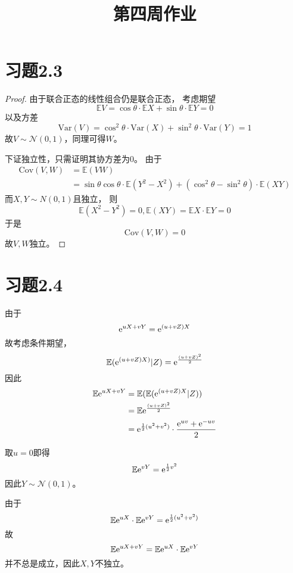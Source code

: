 \documentclass[cn]{homework}
\title{第四周作业}
\newcommand{\E}{\mathbb E}
\newcommand{\var}{\mathrm{Var}}
\newcommand{\cov}{\mathrm{Cov}}
\begin{document}
    \maketitle

    \section{习题2.3}
    \begin{proof}
        由于联合正态的线性组合仍是联合正态，
        考虑期望
        \[\E V=\cos\theta\cdot\E X+\sin\theta\cdot\E Y=0\]
        以及方差
        \[\var(V)=\cos^2\theta\cdot\var(X)+\sin^2\theta\cdot\var(Y)=1\]
        故$V\sim\mathcal N(0,1)$，同理可得$W$。

        下证独立性，只需证明其协方差为0。
        由于
        \[\begin{aligned}
            \cov(V,W)&=\E (VW)\\
            &=\sin\theta\cos\theta\cdot\E(Y^2-X^2)
            +(\cos^2\theta-\sin^2\theta)\cdot\E (XY)
        \end{aligned}\]
        而$X,Y\sim N(0,1)$且独立，
        则
        \[\E(X^2-Y^2)=0,\E(XY)=\E X\cdot\E Y=0\]
        于是
        \[\cov(V,W)=0\]
        故$V,W$独立。
    \end{proof}

    \section{习题2.4}
    \begin{subproblem}
        \item
        由于
        \[\mathrm e^{uX+vY}=\mathrm e^{(u+vZ)X}\]
        故考虑条件期望，
        \[\E(\e^{(u+vZ)X)}|Z)=\e^{\frac{(u+vZ)^2}{2}}\]
        因此
        \[\begin{aligned}
           \E\e^{uX+vY}&=\E(\E(\e^{(u+vZ)X}|Z))\\
           &=\E\e^{\frac{(u+vZ)^2}{2}}\\
           &=\e^{\frac{1}{2}(u^2+v^2)}\cdot\frac{\e^{uv}+\e^{-uv}}{2}
        \end{aligned}\]

        \item
        取$u=0$即得
        \[\E\e^{vY}=\e^{\frac{1}{2}v^2}\]
        因此$Y\sim\mathcal N(0,1)$。

        \item
        由于
        \[\E\e^{uX}\cdot\E\e^{vY}=\e^{\frac{1}{2}(u^2+v^2)}\]
        故
        \[\E\e^{uX+vY}=\E\e^{uX}\cdot\E\e^{vY}\]
        并不总是成立，因此$X,Y$不独立。
    \end{subproblem}
\end{document}
